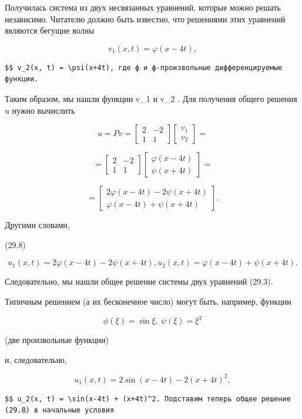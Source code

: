 \documentclass[
  ukrainian,
]{article}
\begin{document}
Получилась система из двух несвязанных уравнений, которые можно решать
независимо. Читателю должно быть известно, что решениями этих уравнений
являются бегущие волны

\[
v_1(x, t) = \varphi(x-4t),
\]

\begin{verbatim}
$$ v_2(x, t) = \psi(x+4t), где ф и ф-произвольные дифференцируемые функции.
\end{verbatim}

Таким образом, мы нашли функции v\_1 и v\_2 . Для получения общего
решения u нужно вычислить

\[
u = Pv = \begin{bmatrix} 2 & -2 \\ 1 & 1 \end{bmatrix} \begin{bmatrix} v_1 \\ v_2 \end{bmatrix} =
\]

\[
= \begin{bmatrix} 2 & -2 \\ 1 & 1 \end{bmatrix} \begin{bmatrix} \varphi(x - 4t) \\ \psi(x + 4t) \end{bmatrix} =
\]

\[
= \begin{bmatrix} 2\varphi(x - 4t) - 2\psi(x + 4t) \\ \varphi(x - 4t) + \psi(x + 4t) \end{bmatrix}.
\]

Другими словами,

(29.8)

\[
u_1(x, t) = 2\varphi(x-4t) - 2\psi(x+4t), u_2(x, t) = \varphi(x-4t) + \psi(x+4t).
\]

Следовательно, мы нашли общее решение системы двух уравнений (29.3).

Типичным решением (а их бесконечное число) могут быть, например, функции

\[
\phi(\xi) = \sin \xi, \ \psi(\xi) = \xi^2
\]

(две произвольные функции)

и, следовательно,

\[
u_1(x, t) = 2 \sin(x-4t) - 2(x+4t)^2,
\]

\begin{verbatim}
$$ u_2(x, t) = \sin(x-4t) + (x+4t)^2. Подставим теперь общее решение (29.8) в начальные условия
\end{verbatim}
\end{document}
